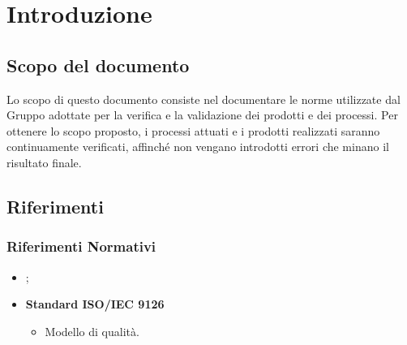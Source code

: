 \documentclass[PianoDiQualifica.tex]{subfiles}
\begin{document}
\chapter{Introduzione}

	\section{Scopo del documento}
	Lo scopo di questo documento consiste nel documentare le norme utilizzate dal Gruppo \gruppo adottate per la verifica e la validazione dei prodotti e dei processi. Per ottenere lo scopo proposto, i processi attuati e i prodotti realizzati saranno continuamente verificati, affinché non vengano introdotti errori che minano il risultato finale.
	
	\scopoProdotto
	
	\glossExpl
	
	\section{Riferimenti}
		\subsection{Riferimenti Normativi}
		\begin{itemize}
			\item \textbf{\ndp \vruno};
			\item \textbf{Standard ISO/IEC 9126}\\
			\begin{itemize}
				\item Modello di qualità.
			\end{itemize}
		\end{itemize}
		
\end{document}
